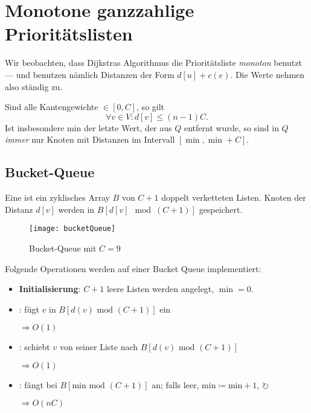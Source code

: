 \section{Monotone ganzzahlige Prioritätslisten}

Wir beobachten, dass Dijkstras Algorithmus die Prioritätsliste \emph{monoton} benutzt ---  und  benutzen nämlich Distanzen der Form \( d[u] + c(e) \). Die Werte nehmen also ständig zu.

Sind alle Kantengewichte \( \in [0,C] \), so gilt
\begin{equation*}
  \forall v \in V: d[v] \leq (n-1)C\text{.}
\end{equation*}
Ist insbesondere min der letzte Wert, der aus \( Q \) entfernt wurde, so sind in \( Q \) \emph{immer} nur Knoten mit Distanzen im Intervall \( [\min, \min+C] \).

\subsection{Bucket-Queue}

\begin{minipage}{.55\textwidth}
  Eine  ist ein zyklisches Array \( B \) von \( C+1 \) doppelt verketteten Listen. Knoten der Distanz \( d[v] \) werden in \( B[d[v] \mod (C+1)] \) gespeichert.  
\end{minipage}
\hfill
\begin{minipage}{.5\textwidth}
  \begin{figure}[H]
    \texttt{[image: bucketQueue]}
    \caption{Bucket-Queue mit \( C = 9 \)}
  \end{figure}
\end{minipage}

Folgende Operationen werden auf einer Bucket Queue implementiert:
\begin{itemize}
  \item \textbf{Initialisierung}: \( C+1 \) leere Listen werden angelegt, \( \min = 0 \).
  \item \textbf{}: fügt \( v \) in \( B[d(v) \text{ mod } (C+1)] \) ein 
  
  \( \Rightarrow O(1) \)

  \item \textbf{}: schiebt \( v \) von seiner Liste nach \( B[d(v) \text{ mod } (C+1)] \)

  \( \Rightarrow O(1) \)

  \item \textbf{}: fängt bei \( B[\text{min mod } (C+1)] \) an; falls leer, \( \text{min} \coloneqq \text{min}+1 \), \( \circlearrowright \)
  
  \( \Rightarrow O(nC) \)
\end{itemize}

